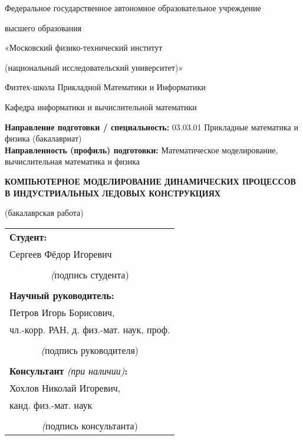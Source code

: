 
\begin{titlepage}
    \begin{center}
        Федеральное государственное автономное образовательное учреждение
        
        высшего образования
        
        «Московский физико-технический институт
        
        (национальный исследовательский университет)»
        
        Физтех-школа Прикладной Математики и Информатики
        
        Кафедра информатики и вычислительной математики
    \end{center}

    \begin{flushleft}
        \textbf{Направление подготовки / специальность:} 03.03.01  Прикладные математика и физика (бакалавриат)\\
        
        \textbf{Направленность (профиль) подготовки:} Математическое моделирование, вычислительная математика и физика
    \end{flushleft}

    \begin{center}
        \vspace{\fill}
        \Large \bfseries
        КОМПЬЮТЕРНОЕ МОДЕЛИРОВАНИЕ ДИНАМИЧЕСКИХ ПРОЦЕССОВ В ИНДУСТРИАЛЬНЫХ ЛЕДОВЫХ КОНСТРУКЦИЯХ \vspace{1em}
        
        \normalsize \normalfont
        (бакалаврская работа)
        \vspace{\fill}
    \end{center}

    \hfill
    \begin{tabular}{@{}l@{}}
        \textbf{Студент:} \\
        Сергеев Фёдор Игоревич \\
        \medskip\\
        \hline\multicolumn{1}{c}{{\textit (подпись студента)}}\\
        \\
        \textbf{Научный руководитель:} \\
        Петров Игорь Борисович, \\
        чл.-корр. РАН, д. физ.-мат. наук, проф.\\
        \medskip\\
        \hline\multicolumn{1}{c}{{\textit (подпись руководителя)}}\\
        \\
        \textbf{Консультант} \textit{(при наличии)}\textbf{:} \\
        Хохлов Николай Игоревич, \\
        канд. физ.-мат. наук \\
        \medskip\\
        \hline\multicolumn{1}{c}{{\textit (подпись консультанта)}}
    \end{tabular}


\end{titlepage}
